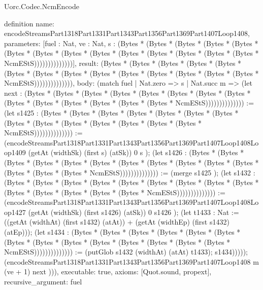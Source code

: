 \begin{lexlean}{Uorc.Codec.NcmEncode}
\begin{semanticmodule}
definition{
  name: encodeStreamsPart1318Part1331Part1343Part1356Part1369Part1407Loop1408,
  parameters: [fuel : Nat, ve : Nat, s : (Bytes * (Bytes * (Bytes * (Bytes * (Bytes * (Bytes * (Bytes * (Bytes * (Bytes * (Bytes * (Bytes * (Bytes * (Bytes * (Bytes * NcmEStS))))))))))))))],
  result: (Bytes * (Bytes * (Bytes * (Bytes * (Bytes * (Bytes * (Bytes * (Bytes * (Bytes * (Bytes * (Bytes * (Bytes * (Bytes * (Bytes * NcmEStS)))))))))))))),
  body: (match fuel
    | Nat.zero => s
    | Nat.succ m => (let next : (Bytes * (Bytes * (Bytes * (Bytes * (Bytes * (Bytes * (Bytes * (Bytes * (Bytes * (Bytes * (Bytes * (Bytes * (Bytes * (Bytes * NcmEStS)))))))))))))) := (let s1425 : (Bytes * (Bytes * (Bytes * (Bytes * (Bytes * (Bytes * (Bytes * (Bytes * (Bytes * (Bytes * (Bytes * (Bytes * (Bytes * (Bytes * NcmEStS)))))))))))))) := (encodeStreamsPart1318Part1331Part1343Part1356Part1369Part1407Loop1408Loop1409 (getAt (widthSk) (first s) (atSk)) 0 s ); (let s1426 : (Bytes * (Bytes * (Bytes * (Bytes * (Bytes * (Bytes * (Bytes * (Bytes * (Bytes * (Bytes * (Bytes * (Bytes * (Bytes * (Bytes * NcmEStS)))))))))))))) := (merge s1425 ); (let s1432 : (Bytes * (Bytes * (Bytes * (Bytes * (Bytes * (Bytes * (Bytes * (Bytes * (Bytes * (Bytes * (Bytes * (Bytes * (Bytes * (Bytes * NcmEStS)))))))))))))) := (encodeStreamsPart1318Part1331Part1343Part1356Part1369Part1407Loop1408Loop1427 (getAt (widthSk) (first s1426) (atSk)) 0 s1426 ); (let t1433 : Nat := ((getAt (widthAt) (first s1432) (atAt)) + (getAt (widthEp) (first s1432) (atEp))); (let s1434 : (Bytes * (Bytes * (Bytes * (Bytes * (Bytes * (Bytes * (Bytes * (Bytes * (Bytes * (Bytes * (Bytes * (Bytes * (Bytes * (Bytes * NcmEStS)))))))))))))) := (putGlob s1432 (widthAt) (atAt) t1433); s1434))))); (encodeStreamsPart1318Part1331Part1343Part1356Part1369Part1407Loop1408 m (ve + 1) next ))),
  executable: true,
  axioms: [Quot.sound, propext],
  recursive_argument: fuel
}


\end{semanticmodule}
\end{lexlean}
